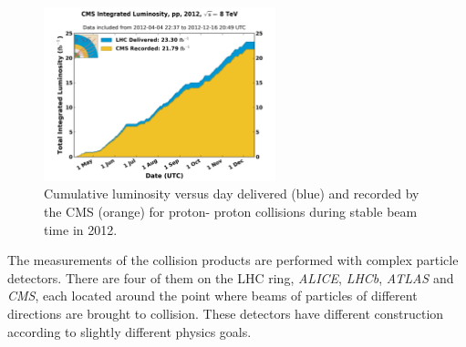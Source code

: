 \begin{figure}[t]
  \centering
  \includegraphics[width=0.6\textwidth]{02_experimental_setup/plots/int_lumi_per_day_cumulative_pp_2012.png}
  \caption{Cumulative luminosity versus day delivered (blue) and recorded by the CMS (orange) for proton-
  proton collisions during stable beam time in 2012.}
  \label{fig:LumiCMS}
\end{figure}



The measurements of the collision products are performed with complex particle detectors. There are four of them on the 
LHC ring, \textit{ALICE}, \textit{LHCb}, \textit{ATLAS} and \textit{CMS}, each located around the point where beams 
of particles of different directions are brought to collision.
These detectors have different construction according to slightly different physics goals.

